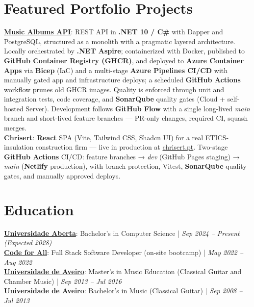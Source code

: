 \documentclass[a4paper,10pt]{article}
\begin{document}
\section{Featured Portfolio Projects}
\vspace{2pt}
{\small
\textbf{\href{https://github.com/fernandotonacoder/music-albums-api}{Music Albums API}}: REST API in \textbf{.NET 10 / C\#} with Dapper and PostgreSQL, structured as a monolith with a pragmatic layered architecture. Locally orchestrated by \textbf{.NET Aspire}; containerized with Docker, published to \textbf{GitHub Container Registry (GHCR)}, and deployed to \textbf{Azure Container Apps} via \textbf{Bicep} (IaC) and a multi-stage \textbf{Azure Pipelines CI/CD} with manually gated app and infrastructure deploys; a scheduled \textbf{GitHub Actions} workflow prunes old GHCR images. Quality is enforced through unit and integration tests, code coverage, and \textbf{SonarQube} quality gates (Cloud + self-hosted Server). Development follows \textbf{GitHub Flow} with a single long-lived \textit{main} branch and short-lived feature branches — PR-only changes, required CI, squash merges.\\[2pt]
\textbf{\href{https://github.com/fernandotonacoder/chrisert}{Chrisert}}: \textbf{React} SPA (Vite, Tailwind CSS, Shadcn UI) for a real ETICS-insulation construction firm — live in production at \href{https://chrisert.pt/}{chrisert.pt}. Two-stage \textbf{GitHub Actions} CI/CD: feature branches → \textit{dev} (GitHub Pages staging) → \textit{main} (\textbf{Netlify} production), with branch protection, Vitest, \textbf{SonarQube} quality gates, and manually approved deploys.
}

\section{Education}
\vspace{2pt}
{\small
\textbf{\href{https://guiadoscursos.uab.pt/en/cursos/licenciatura-em-engenharia-informatica/}{Universidade Aberta}}: Bachelor’s in Computer Science | \textit{Sep 2024 -- Present (Expected 2028)}\\[2pt]
\textbf{\href{https://codeforall.com/}{Code for All}}: Full Stack Software Developer (on-site bootcamp) | \textit{May 2022 -- Aug 2022}\\[2pt]
\textbf{\href{https://www.ua.pt/en/curso/184/}{Universidade de Aveiro}}: Master’s in Music Education (Classical Guitar and Chamber Music) | \textit{Sep 2013 -- Jul 2016}\\[2pt]
\textbf{\href{https://www.ua.pt/en/curso/40/}{Universidade de Aveiro}}: Bachelor’s in Music (Classical Guitar) | \textit{Sep 2008 -- Jul 2013}
}
\end{document}

